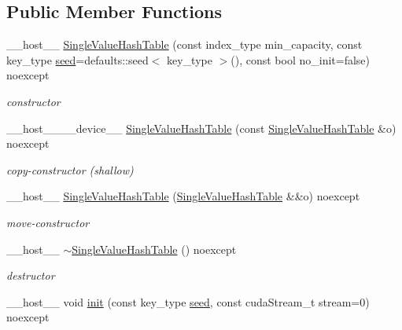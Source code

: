 \subsection*{Public Member Functions}
\begin{DoxyCompactItemize}
\item 
\+\_\+\+\_\+host\+\_\+\+\_\+ \hyperlink{classwarpcore_1_1SingleValueHashTable_a7cb8b01ed6c2ceee8118e398eb4dde83}{Single\+Value\+Hash\+Table} (const index\+\_\+type min\+\_\+capacity, const key\+\_\+type \hyperlink{classwarpcore_1_1SingleValueHashTable_a28ba5f6952bad405f7d005cd5867e973}{seed}=defaults\+::seed$<$ key\+\_\+type $>$(), const bool no\+\_\+init=false) noexcept
\begin{DoxyCompactList}\small\item\em constructor \end{DoxyCompactList}\item 
\+\_\+\+\_\+host\+\_\+\+\_\+\+\_\+\+\_\+device\+\_\+\+\_\+ \hyperlink{classwarpcore_1_1SingleValueHashTable_a59e29f9fdfb395cca5838822b55488e0}{Single\+Value\+Hash\+Table} (const \hyperlink{classwarpcore_1_1SingleValueHashTable}{Single\+Value\+Hash\+Table} \&o) noexcept
\begin{DoxyCompactList}\small\item\em copy-\/constructor (shallow) \end{DoxyCompactList}\item 
\+\_\+\+\_\+host\+\_\+\+\_\+ \hyperlink{classwarpcore_1_1SingleValueHashTable_a8dcaffe8bc23ec0fdd2cd45d3033ddeb}{Single\+Value\+Hash\+Table} (\hyperlink{classwarpcore_1_1SingleValueHashTable}{Single\+Value\+Hash\+Table} \&\&o) noexcept
\begin{DoxyCompactList}\small\item\em move-\/constructor \end{DoxyCompactList}\item 
\mbox{\label{classwarpcore_1_1SingleValueHashTable_a71153a36251ecf2609fb868b02c2d616}} 
\+\_\+\+\_\+host\+\_\+\+\_\+ \hyperlink{classwarpcore_1_1SingleValueHashTable_a71153a36251ecf2609fb868b02c2d616}{$\sim$\+Single\+Value\+Hash\+Table} () noexcept
\begin{DoxyCompactList}\small\item\em destructor \end{DoxyCompactList}\item 
\+\_\+\+\_\+host\+\_\+\+\_\+ void \hyperlink{classwarpcore_1_1SingleValueHashTable_adb573d3eb31825a4741ee7953bd69396}{init} (const key\+\_\+type \hyperlink{classwarpcore_1_1SingleValueHashTable_a28ba5f6952bad405f7d005cd5867e973}{seed}, const cuda\+Stream\+\_\+t stream=0) noexcept

\end{DoxyCompactItemize}

